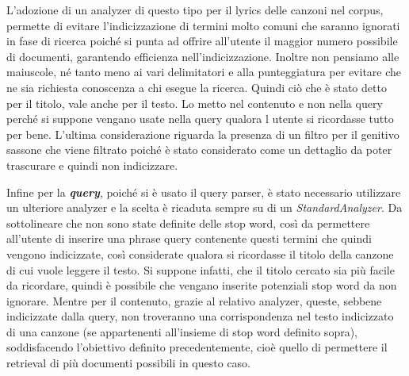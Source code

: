 \documentclass{article}
\begin{document}
L'adozione di un analyzer di questo tipo per il lyrics delle canzoni nel corpus, permette di evitare l'indicizzazione di termini molto comuni che saranno ignorati in fase di ricerca poiché si punta ad offrire all'utente il maggior numero possibile di documenti, garantendo efficienza nell'indicizzazione. Inoltre non pensiamo alle maiuscole, né tanto meno ai vari delimitatori e alla punteggiatura per evitare che ne sia richiesta conoscenza a chi esegue la ricerca. Quindi ciò che è stato detto per il titolo, vale anche per il testo. Lo metto nel contenuto e non nella query perché si suppone vengano usate nella query qualora l utente si ricordasse tutto per bene.
L'ultima considerazione riguarda la presenza di un filtro per il genitivo sassone che viene filtrato poiché è stato considerato come un dettaglio da poter trascurare e quindi non indicizzare.

Infine per la \textbf{\textit{query}}, poiché si è usato il query parser, è stato necessario utilizzare un ulteriore analyzer e la scelta è ricaduta sempre su di un \textit{StandardAnalyzer}.
Da sottolineare che non sono state definite delle stop word, così da permettere all'utente di inserire una phrase query contenente questi termini che quindi vengono indicizzate, così considerate qualora si ricordasse il titolo della canzone di cui vuole leggere il testo. Si suppone infatti, che il titolo cercato sia più facile da ricordare, quindi è possibile che vengano inserite potenziali stop word da non ignorare. Mentre per il contenuto, grazie al relativo analyzer, queste, sebbene indicizzate dalla query, non troveranno una corrispondenza nel testo indicizzato di una canzone (se appartenenti all'insieme di stop word definito sopra), soddisfacendo l'obiettivo definito precedentemente, cioè quello di permettere il retrieval di più documenti possibili in questo caso.
\end{document}
